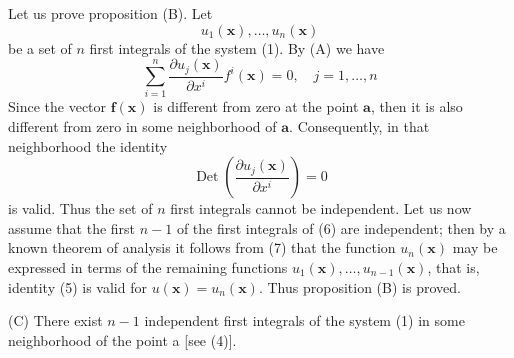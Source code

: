 \documentclass[10pt,a5paper]{book}
\theoremstyle{plain}
\theoremstyle{definition}
\theoremstyle{remark}
\begin{document}
Let us prove proposition (B). Let
\begin{equation*}
u_{1}(\mathbf{x}), \ldots, u_{n}(\mathbf{x}) \tag{6}
\end{equation*}
be a set of $n$ first integrals of the system (1). By (A) we have
\[
\sum_{i=1}^{n} \frac{\partial u_{j}(\mathbf{x})}{\partial x^{i}} f^{i}(\mathbf{x})=0, \quad j=1, \ldots, n
\]
Since the vector $\mathbf{f}(\mathbf{x})$ is different from zero at the point $\mathbf{a}$, then it is also different from zero in some neighborhood of $\mathbf{a}$. Consequently, in that neighborhood the identity
\begin{equation*}
\operatorname{Det}\left(\frac{\partial u_{j}(\mathbf{x})}{\partial x^{i}}\right)=0 \tag{7}
\end{equation*}
is valid. Thus the set of $n$ first integrals cannot be independent. Let us now assume that the first $n-1$ of the first integrals of (6) are independent; then by a known theorem of analysis it follows from (7) that the function $u_{n}(\mathbf{x})$ may be expressed in terms of the remaining functions $u_{1}(\mathbf{x}), \ldots, u_{n-1}(\mathbf{x})$, that is, identity (5) is valid for $u(\mathbf{x})=u_{n}(\mathbf{x})$. Thus proposition (B) is proved.

(C) There exist $n-1$ independent first integrals of the system (1) in some neighborhood of the point a [see (4)].
\end{document}
